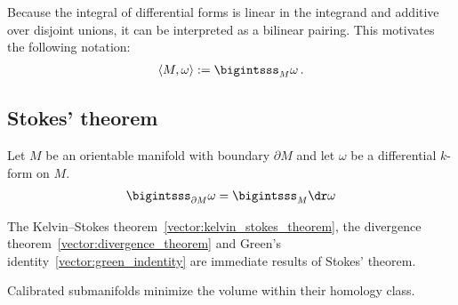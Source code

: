 
    \begin{notation}
        Because the integral of differential forms is linear in the integrand and additive over disjoint unions, it can be interpreted as a bilinear pairing. This motivates the following notation:
        \begin{gather}
            \langle M,\omega \rangle := \bigintsss_M\omega\,.
        \end{gather}
    \end{notation}

\subsection{Stokes' theorem}

    \begin{theorem}\label{bundle:stokes_theorem}
        Let $M$ be an orientable manifold with boundary $\partial M$ and let $\omega$ be a differential $k$-form on $M$.
        \begin{gather}
            \bigintsss_{\partial M}\omega = \bigintsss_M\dr\omega
        \end{gather}
    \end{theorem}
    \begin{result}
        The Kelvin--Stokes theorem~\ref{vector:kelvin_stokes_theorem}, the divergence theorem~\ref{vector:divergence_theorem} and Green's identity~\ref{vector:green_indentity} are immediate results of Stokes' theorem.
    \end{result}

    \begin{property}
        Calibrated submanifolds minimize the volume within their homology class.
    \end{property}